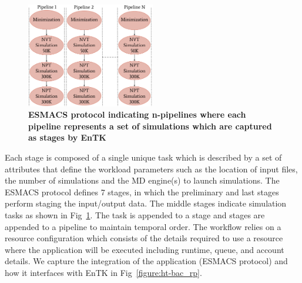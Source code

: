 \begin{figure}[ht]
\centering
  \includegraphics[width=0.5\textwidth]{FIGURES/HT-BAC_NAMD_pipelines_control_flow_only.pdf}
  \caption{\bf ESMACS protocol indicating n-pipelines where each pipeline represents a set of simulations which are captured as stages by EnTK}
   \label{figure:ESMACS-pipelines}
\end{figure}


Each stage is composed of a single unique task which is described by a set of attributes that define the workload parameters such as the location of input files, the number of simulations and the MD engine(s) to launch simulations. The ESMACS protocol defines 7 stages, in which the preliminary and last stages perform staging the input/output data. The middle stages indicate simulation tasks as shown in Fig~\ref{figure:ESMACS-pipelines}. The task is appended to a stage and stages are appended to a pipeline to maintain temporal order. The workflow relies on a resource configuration which consists of the details required to use a resource where the application will be executed including runtime, queue, and account details. We capture the integration of the application (ESMACS protocol) and how it interfaces with EnTK in Fig~\ref{figure:ht-bac_rp}. 

